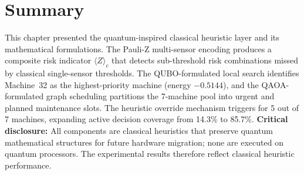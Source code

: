 \section{Summary}

This chapter presented the quantum-inspired classical heuristic layer and its mathematical formulations. The Pauli-Z multi-sensor encoding produces a composite risk indicator $\langle Z \rangle_c$ that detects sub-threshold risk combinations missed by classical single-sensor thresholds. The QUBO-formulated local search identifies Machine~32 as the highest-priority machine (energy $-0.5144$), and the QAOA-formulated graph scheduling partitions the 7-machine pool into urgent and planned maintenance slots. The heuristic override mechanism triggers for 5 out of 7 machines, expanding active decision coverage from 14.3\% to 85.7\%. \textbf{Critical disclosure:} All components are classical heuristics that preserve quantum mathematical structures for future hardware migration; none are executed on quantum processors. The experimental results therefore reflect classical heuristic performance.

